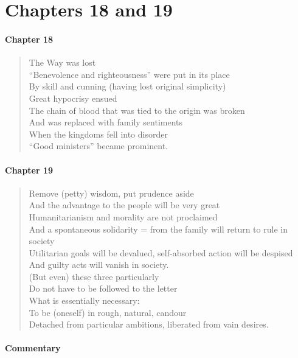 \section{Chapters 18 and 19}

\paragraph{Chapter 18}

\begin{verse}
The Way was lost\\ ``Benevolence and righteousness'' were put in its place\\ By skill and cunning (having lost original simplicity)\\ Great hypocrisy ensued\\ The chain of blood that was tied to the origin was broken\\ And was replaced with family sentiments\\ When the kingdoms fell into disorder\\ ``Good ministers'' became prominent.
\end{verse}

\paragraph{Chapter 19}

\begin{verse}
Remove (petty) wisdom, put prudence aside\\ And the advantage to the people will be very great\\ Humanitarianism and morality are not proclaimed\\ And a spontaneous solidarity = from the family will return to rule in society\\ Utilitarian goals will be devalued, self-absorbed action will be despised\\ And guilty acts will vanish in society.\\ (But even) these three particularly\\ Do not have to be followed to the letter\\ What is essentially necessary:\\ To be (oneself) in rough, natural, candour\\ Detached from particular ambitions, liberated from vain desires.
\end{verse}

\paragraph{Commentary}


